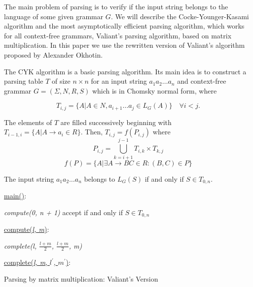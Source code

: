 The main problem of parsing is to verify if the input string belongs to the language of some given grammar $G$. We will describe the Cocke-Younger-Kasami algorithm and the most asymptotically efficient parsing algorithm, which works for all context-free grammars, Valiant's parsing algorithm, based on matrix multiplication. In this paper we use the rewritten version of Valiant's algorithm proposed by Alexander Okhotin.

The CYK algorithm is a basic parsing algorithm.
Its main idea is to construct a parsing table $T$ of size $n \times n$ for an input string $a_{1}a_{2} \dots a_{n}$ and context-free grammar $G = (\Sigma, N, R, S)$ which is in Chomsky normal form, where

$$T_{i, j} =  \{ A | A \in N, a_{i + 1} \dots a_{j} \in L_{G}(A)\} \quad \forall i < j.$$

The elements of $T$ are filled successively beginning with
$ T_{i - 1, i} = \{ A | A \rightarrow a_{i} \in R\}.$
Then, $ T_{i, j} = f(P_{i, j})$ where
$$ P_{i, j} = \bigcup\limits_{k = i + 1}^{j - 1} T_{i,k} \times T_{k, j}  $$
$$ f(P) = \{A | \exists A \rightarrow BC \in R : (B, C) \in P\} $$

The input string $a_{1}a_{2} \dots a_{n}$ belongs to $L_{G}(S)$ if and only if $S \in T_{0, n}$.

\begin{algorithm}[t]
\SetAlgoNoLine
{}
\underline{main()}{:}{

 \textit{compute(0, n + 1)\;}
 accept if and only if $S \in T_{0, n}$
 \linebreak
 }

\underline{compute(\textit{l, m})}{:}{

 \textit{complete(l, $\frac{l+m}{2}$, $\frac{l+m}{2}$, m)}
 \linebreak
 }

\underline{complete(\textit{l, m}, $l^\prime$, $m^\prime$)}{:}{

 }
\caption{Parsing by matrix multiplication: Valiant's Version}
\end{algorithm}

